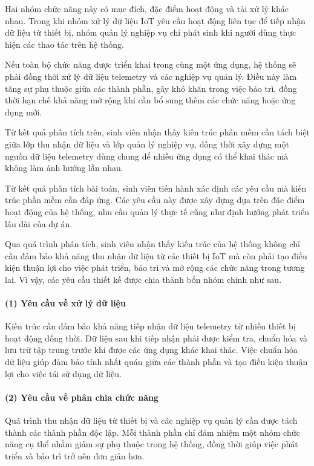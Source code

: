 Hai nhóm chức năng này có mục đích, đặc điểm hoạt động và tải xử lý khác nhau. Trong khi nhóm xử lý dữ liệu IoT yêu cầu hoạt động liên tục để tiếp nhận dữ liệu từ thiết bị, nhóm quản lý nghiệp vụ chỉ phát sinh khi người dùng thực hiện các thao tác trên hệ thống.

Nếu toàn bộ chức năng được triển khai trong cùng một ứng dụng, hệ thống sẽ phải đồng thời xử lý dữ liệu telemetry và các nghiệp vụ quản lý. Điều này làm tăng sự phụ thuộc giữa các thành phần, gây khó khăn trong việc bảo trì, đồng thời hạn chế khả năng mở rộng khi cần bổ sung thêm các chức năng hoặc ứng dụng mới.

Từ kết quả phân tích trên, sinh viên nhận thấy kiến trúc phần mềm cần tách biệt giữa lớp thu nhận dữ liệu và lớp quản lý nghiệp vụ, đồng thời xây dựng một nguồn dữ liệu telemetry dùng chung để nhiều ứng dụng có thể khai thác mà không làm ảnh hưởng lẫn nhau.

Từ kết quả phân tích bài toán, sinh viên tiến hành xác định các yêu cầu mà kiến trúc phần mềm cần đáp ứng. Các yêu cầu này được xây dựng dựa trên đặc điểm hoạt động của hệ thống, nhu cầu quản lý thực tế cũng như định hướng phát triển lâu dài của dự án.

Qua quá trình phân tích, sinh viên nhận thấy kiến trúc của hệ thống không chỉ cần đảm bảo khả năng thu nhận dữ liệu từ các thiết bị IoT mà còn phải tạo điều kiện thuận lợi cho việc phát triển, bảo trì và mở rộng các chức năng trong tương lai. Vì vậy, các yêu cầu thiết kế được chia thành bốn nhóm chính như sau.

\paragraph*{(1) Yêu cầu về xử lý dữ liệu}

Kiến trúc cần đảm bảo khả năng tiếp nhận dữ liệu telemetry từ nhiều thiết bị hoạt động đồng thời. Dữ liệu sau khi tiếp nhận phải được kiểm tra, chuẩn hóa và lưu trữ tập trung trước khi được các ứng dụng khác khai thác. Việc chuẩn hóa dữ liệu giúp đảm bảo tính nhất quán giữa các thành phần và tạo điều kiện thuận lợi cho việc tái sử dụng dữ liệu.

\paragraph*{(2) Yêu cầu về phân chia chức năng}

Quá trình thu nhận dữ liệu từ thiết bị và các nghiệp vụ quản lý cần được tách thành các thành phần độc lập. Mỗi thành phần chỉ đảm nhiệm một nhóm chức năng cụ thể nhằm giảm sự phụ thuộc trong hệ thống, đồng thời giúp việc phát triển và bảo trì trở nên đơn giản hơn.

